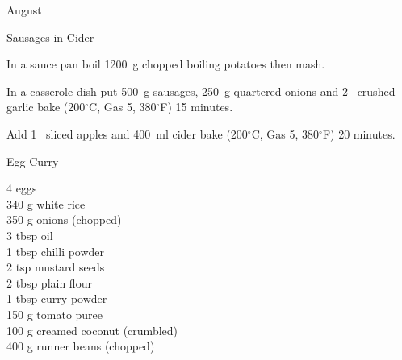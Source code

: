 \begin{menu}{August}
\begin{recipe}{2}{Sausages in Cider}
\begin{ingredients}
		\end{ingredients}
	
	
    \begin{instructions}
    \item 
        In a sauce pan boil
        1200~g chopped boiling potatoes
        then mash.
      \item 
        In a casserole dish put
        500~g  sausages,
        250~g quartered onions
        and
        2~ crushed garlic
        bake (200$^{\circ}$C, Gas 5, 380$^{\circ}$F) 15 minutes.
      \item 
        Add 1~ sliced apples
        and
        400~ml  cider
        bake (200$^{\circ}$C, Gas 5, 380$^{\circ}$F) 20 minutes.
      
    \end{instructions}
    \end{recipe}%
  
    \begin{recipe}{2}{Egg Curry}%
		\begin{ingredients}
		4  eggs  \\
	340 g white rice  \\
	350 g onions (chopped) \\
	3 tbsp oil  \\
	1 tbsp chilli powder  \\
	2 tsp mustard seeds  \\
	2 tbsp plain flour  \\
	1 tbsp curry powder  \\
	150 g tomato puree  \\
	100 g creamed coconut (crumbled) \\
	400 g runner beans (chopped) \\
	
		\end{ingredients}
	
	
	

\end{recipe}
\end{menu}
